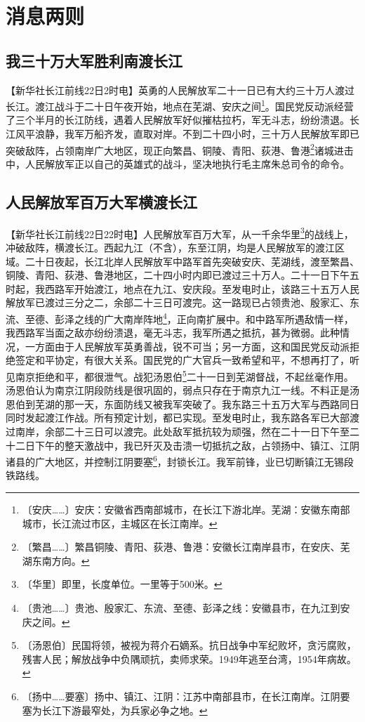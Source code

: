 \documentclass[12pt,UTF-8,openany]{ctexbook}
\begin{document}
\chapter{消息两则}

\begin{normalsize}
    
    \section{我三十万大军胜利南渡长江}
    
    【新华社长江前线22日2时电】英勇的人民解放军二十一日已有大约三十万人渡过长江。渡江战斗于二十日午夜开始，地点在芜湖、安庆之间\footnote{〔安庆……〕安庆：安徽省西南部城市，在长江下游北岸。芜湖：安徽东南部城市，长江流过市区，主城区在长江南岸。}。国民党反动派经营了三个半月的长江防线，遇着人民解放军好似摧枯拉朽，军无斗志，纷纷溃退。长江风平浪静，我军万船齐发，直取对岸。不到二十四小时，三十万人民解放军即已突破敌阵，占领南岸广大地区，现正向繁昌、铜陵、青阳、荻港、鲁港\footnote{〔繁昌……〕繁昌铜陵、青阳、荻港、鲁港：安徽长江南岸县市，在安庆、芜湖东南方向。}诸城进击中，人民解放军正以自己的英雄式的战斗，坚决地执行毛主席朱总司令的命令。
    
    \section{人民解放军百万大军横渡长江}
    
    【新华社长江前线22日22时电】人民解放军百万大军，从一千余华里\footnote{〔华里〕即里，长度单位。一里等于500米。}的战线上，冲破敌阵，横渡长江。西起九江（不含），东至江阴，均是人民解放军的渡江区域。二十日夜起，长江北岸人民解放军中路军首先突破安庆、芜湖线，渡至繁昌、铜陵、青阳、荻港、鲁港地区，二十四小时内即已渡过三十万人。二十一日下午五时起，我西路军开始渡江，地点在九江、安庆段。至发电时止，该路三十五万人民解放军已渡过三分之二，余部二十三日可渡完。这一路现已占领贵池、殷家汇、东流、至德、彭泽之线的广大南岸阵地\footnote{〔贵池……〕贵池、殷家汇、东流、至德、彭泽之线：安徽县市，在九江到安庆之间。}，正向南扩展中。和中路军所遇敌情一样，我西路军当面之敌亦纷纷溃退，毫无斗志，我军所遇之抵抗，甚为微弱。此种情况，一方面由于人民解放军英勇善战，锐不可当；另一方面，这和国民党反动派拒绝签定和平协定，有很大关系。国民党的广大官兵一致希望和平，不想再打了，听见南京拒绝和平，都很泄气。战犯汤恩伯\footnote{〔汤恩伯〕民国将领，被视为蒋介石嫡系。抗日战争中军纪败坏，贪污腐败，残害人民；解放战争中负隅顽抗，卖师求荣。1949年逃至台湾，1954年病故。}二十一日到芜湖督战，不起丝毫作用。汤恩伯认为南京江阴段防线是很巩固的，弱点只存在于南京九江一线。不料正是汤恩伯到芜湖的那一天，东面防线又被我军突破了。我东路三十五万大军与西路同日同时发起渡江作战。所有预定计划，都已实现。至发电时止，我东路各军已大部渡过南岸，余部二十三日可以渡完。此处敌军抵抗较为顽强，然在二十一日下午至二十二日下午的整天激战中，我已歼灭及击溃一切抵抗之敌，占领扬中、镇江、江阴诸县的广大地区，并控制江阴要塞\footnote{〔扬中……要塞〕扬中、镇江、江阴：江苏中南部县市，在长江南岸。江阴要塞为长江下游最窄处，为兵家必争之地。}，封锁长江。我军前锋，业已切断镇江无锡段铁路线。
    
\end{normalsize}
\end{document}
